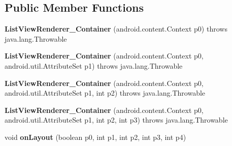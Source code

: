\subsection*{Public Member Functions}
\begin{DoxyCompactItemize}
\item 
\mbox{\label{classmd5b60ffeb829f638581ab2bb9b1a7f4f3f_1_1_list_view_renderer___container_a960e9091cd0ede6811fa2f774ac998a3}} 
{\bfseries List\+View\+Renderer\+\_\+\+Container} (android.\+content.\+Context p0)  throws java.\+lang.\+Throwable 	
\item 
\mbox{\label{classmd5b60ffeb829f638581ab2bb9b1a7f4f3f_1_1_list_view_renderer___container_a079f089bf8a9f4a35ec59ce04abb3d98}} 
{\bfseries List\+View\+Renderer\+\_\+\+Container} (android.\+content.\+Context p0, android.\+util.\+Attribute\+Set p1)  throws java.\+lang.\+Throwable 	
\item 
\mbox{\label{classmd5b60ffeb829f638581ab2bb9b1a7f4f3f_1_1_list_view_renderer___container_af8b2fbe4aa6217fcb86a29f17c80199b}} 
{\bfseries List\+View\+Renderer\+\_\+\+Container} (android.\+content.\+Context p0, android.\+util.\+Attribute\+Set p1, int p2)  throws java.\+lang.\+Throwable 	
\item 
\mbox{\label{classmd5b60ffeb829f638581ab2bb9b1a7f4f3f_1_1_list_view_renderer___container_a2b3ef6ca6e9196714d957f000cff52e3}} 
{\bfseries List\+View\+Renderer\+\_\+\+Container} (android.\+content.\+Context p0, android.\+util.\+Attribute\+Set p1, int p2, int p3)  throws java.\+lang.\+Throwable 	
\item 
\mbox{\label{classmd5b60ffeb829f638581ab2bb9b1a7f4f3f_1_1_list_view_renderer___container_ab2f05621c7c998e3bdbfbef1a0e32fad}} 
void {\bfseries on\+Layout} (boolean p0, int p1, int p2, int p3, int p4)
\item 
\mbox{\label{classmd5b60ffeb829f638581ab2bb9b1a7f4f3f_1_1_list_view_renderer___container_a9ef651c952dc03df56f4c0fbe827df8d}} 

\end{DoxyCompactItemize}
